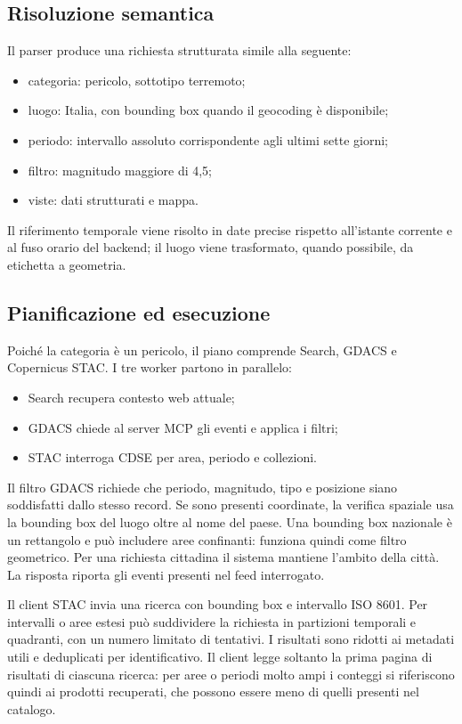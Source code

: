 \subsection{Risoluzione semantica}

Il parser produce una richiesta strutturata simile alla seguente:

\begin{itemize}
    \item categoria: pericolo, sottotipo terremoto;
    \item luogo: Italia, con bounding box quando il geocoding è disponibile;
    \item periodo: intervallo assoluto corrispondente agli ultimi sette giorni;
    \item filtro: magnitudo maggiore di 4,5;
    \item viste: dati strutturati e mappa.
\end{itemize}

Il riferimento temporale viene risolto in date precise rispetto all'istante
corrente e al fuso orario del backend; il luogo viene trasformato, quando
possibile, da etichetta a geometria.

\subsection{Pianificazione ed esecuzione}

Poiché la categoria è un pericolo, il piano comprende Search, GDACS e
Copernicus STAC. I tre worker partono in parallelo:

\begin{itemize}
    \item Search recupera contesto web attuale;
    \item GDACS chiede al server MCP gli eventi e applica i filtri;
    \item STAC interroga CDSE per area, periodo e collezioni.
\end{itemize}

Il filtro GDACS richiede che periodo, magnitudo, tipo e posizione siano
soddisfatti dallo stesso record. Se sono presenti coordinate, la verifica
spaziale usa la bounding box del luogo oltre al nome del paese. Una bounding
box nazionale è un rettangolo e può includere aree confinanti: funziona quindi
come filtro geometrico. Per una richiesta cittadina il sistema mantiene
l'ambito della città. La risposta riporta gli eventi presenti nel feed
interrogato.

Il client STAC invia una ricerca con bounding box e intervallo ISO 8601. Per
intervalli o aree estesi può suddividere la richiesta in partizioni temporali
e quadranti, con un numero limitato di tentativi. I risultati sono ridotti ai
metadati utili e deduplicati per identificativo. Il client legge soltanto la
prima pagina di risultati di ciascuna ricerca: per aree o periodi molto ampi
i conteggi si riferiscono quindi ai prodotti recuperati, che possono essere
meno di quelli presenti nel catalogo.


